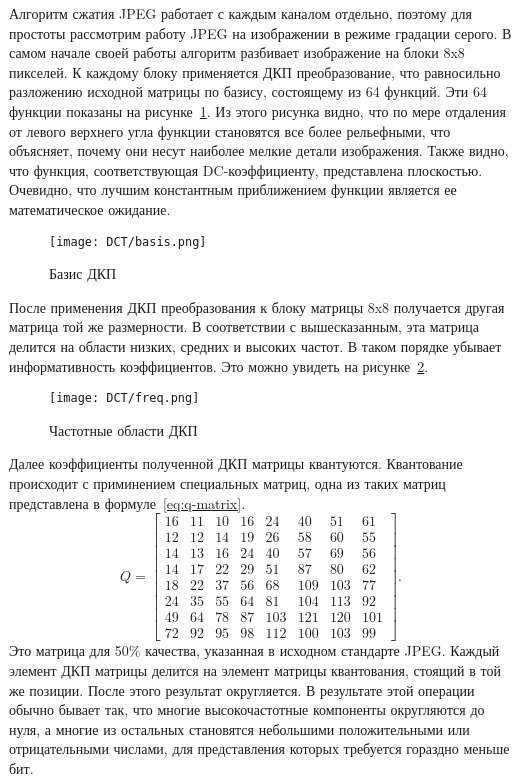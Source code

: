 Алгоритм сжатия JPEG работает с каждым каналом отдельно, поэтому для
простоты рассмотрим работу JPEG на изображении в режиме градации серого.
В самом начале своей работы алгоритм разбивает изображение на блоки
8x8 пикселей. К каждому блоку применяется ДКП преобразование,
что равносильно разложению исходной матрицы по базису, состоящему
из 64 функций. Эти 64 функции показаны на рисунке~\ref{img:basis}.
Из этого рисунка видно, что по мере отдаления от левого верхнего угла
функции становятся все более рельефными, что объясняет, почему они несут
наиболее мелкие детали изображения. Также видно, что функция,
соответствующая DC-коэффициенту, представлена плоскостью. Очевидно,
что лучшим константным приближением функции
является ее математическое ожидание.
\begin{figure}[ht]
    \centering
    \caption{Базис ДКП}
    \texttt{[image: DCT/basis.png]}
    \label{img:basis}
\end{figure}
После применения ДКП преобразования к блоку матрицы 8x8
получается другая матрица той же размерности. В соответствии с вышесказанным,
эта матрица делится на области низких, средних и высоких частот. В таком порядке
убывает информативность коэффициентов. Это можно увидеть на рисунке~\ref{img:freq}.
\begin{figure}[ht]
    \centering
    \caption{Частотные области ДКП}
    \texttt{[image: DCT/freq.png]}
    \label{img:freq}
\end{figure}
Далее коэффициенты полученной ДКП матрицы квантуются.
Квантование происходит с приминением специальных матриц,
одна из таких матриц представлена в формуле~\ref{eq:q-matrix}.
\begin{equation} \label{eq:q-matrix}
Q=
\begin{bmatrix}
 16 & 11 & 10 & 16 & 24 & 40 & 51 & 61 \\
 12 & 12 & 14 & 19 & 26 & 58 & 60 & 55 \\
 14 & 13 & 16 & 24 & 40 & 57 & 69 & 56 \\
 14 & 17 & 22 & 29 & 51 & 87 & 80 & 62 \\
 18 & 22 & 37 & 56 & 68 & 109 & 103 & 77 \\
 24 & 35 & 55 & 64 & 81 & 104 & 113 & 92 \\
 49 & 64 & 78 & 87 & 103 & 121 & 120 & 101 \\
 72 & 92 & 95 & 98 & 112 & 100 & 103 & 99
\end{bmatrix}.
\end{equation}
Это матрица для 50\% качества, указанная в исходном стандарте JPEG.
Каждый элемент ДКП матрицы делится на элемент матрицы квантования,
стоящий в той же позиции. После этого результат округляется. В результате
этой операции обычно бывает так, что многие высокочастотные компоненты
округляются до нуля, а многие из остальных становятся небольшими положительными
или отрицательными числами, для представления которых требуется гораздно меньше бит.

